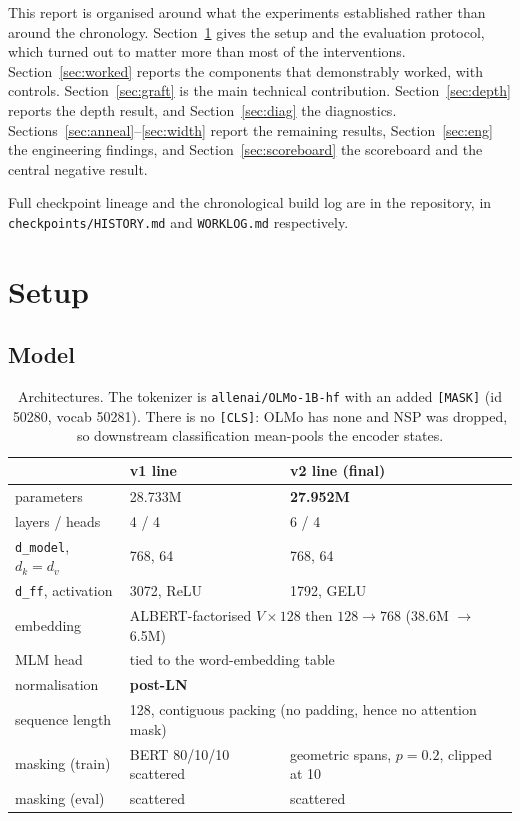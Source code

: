 \documentclass[11pt,a4paper]{article}
\newcommand{\dff}{\texttt{d\_ff}}
\newcommand{\dmodel}{\texttt{d\_model}}
\begin{document}
This report is organised around what the experiments established rather than around the
chronology. Section~\ref{sec:setup} gives the setup and the evaluation protocol, which turned
out to matter more than most of the interventions. Section~\ref{sec:worked} reports the
components that demonstrably worked, with controls. Section~\ref{sec:graft} is the main
technical contribution. Section~\ref{sec:depth} reports the depth result, and
Section~\ref{sec:diag} the diagnostics. Sections~\ref{sec:anneal}--\ref{sec:width} report the
remaining results, Section~\ref{sec:eng} the engineering findings, and
Section~\ref{sec:scoreboard} the scoreboard and the central negative result.

Full checkpoint lineage and the chronological build log are in the repository, in
\texttt{checkpoints/}\allowbreak\texttt{HISTORY.md} and \texttt{WORKLOG.md} respectively.

\section{Setup}\label{sec:setup}

\subsection{Model}

\begin{table}[H]
\centering\small
\begin{tabular}{lll}
\toprule
& v1 line & v2 line (final) \\
\midrule
parameters                  & 28.733M & \textbf{27.952M} \\
layers / heads              & 4 / 4   & 6 / 4 \\
\dmodel, $d_k = d_v$        & 768, 64 & 768, 64 \\
\dff, activation            & 3072, ReLU & 1792, GELU \\
embedding                   & \multicolumn{2}{l}{ALBERT-factorised $V{\times}128$ then $128{\to}768$ (38.6M $\to$ 6.5M)} \\
MLM head                    & \multicolumn{2}{l}{tied to the word-embedding table} \\
normalisation               & \multicolumn{2}{l}{\textbf{post-LN}} \\
sequence length             & \multicolumn{2}{l}{128, contiguous packing (no padding, hence no attention mask)} \\
masking (train)             & BERT 80/10/10 scattered & geometric spans, $p{=}0.2$, clipped at 10 \\
masking (eval)              & scattered & scattered \\
\bottomrule
\end{tabular}
\caption{Architectures. The tokenizer is \texttt{allenai/OLMo-1B-hf} with an added
\texttt{[MASK]} (id 50280, vocab 50281). There is no \texttt{[CLS]}: OLMo has none and NSP was
dropped, so downstream classification mean-pools the encoder states.}
\end{table}
\end{document}
